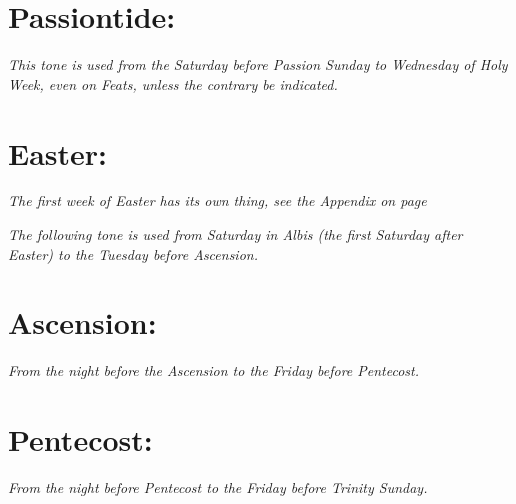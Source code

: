 \documentclass[a5paper,12pt,twoside,openany]{memoir}
\newcommand\rubrics[1]{\textit{#1}}
\begin{document}
\goodbreak


\section{Passiontide:}

\rubrics{This tone is used from the Saturday before Passion Sunday to Wednesday of Holy Week, even on Feats, unless the contrary be indicated.}


\goodbreak


\section{Easter:}

\rubrics{The first week of Easter has its own thing, see the Appendix on page \pageref{EasterOctave}}

\rubrics{The following tone is used from Saturday in Albis (the first Saturday after Easter) to the Tuesday before Ascension.}


\goodbreak


\section{Ascension:}

\rubrics{From the night before the Ascension to the Friday before Pentecost.}


\goodbreak


\section{Pentecost:}

\rubrics{From the night before Pentecost to the Friday before Trinity Sunday.}



\end{document}
